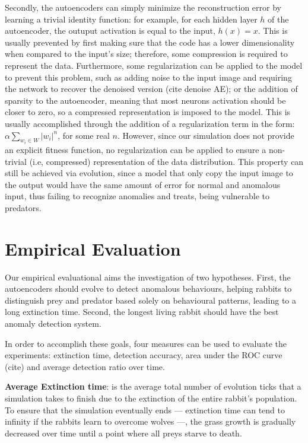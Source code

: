 \documentclass[letterpaper]{article}
\numberwithin{equation}{section}
\numberwithin{theorem}{section}
\numberwithin{lemma}{section}
\numberwithin{df}{section}
\begin{document}
Secondly, the autoencoders can simply minimize the reconstruction error by learning a trivial identity function: for example, for each hidden layer $h$ of the autoencoder, the outuput activation is equal to the input, $h(x) = x$. This is usually prevented by first making sure that the code has a lower dimensionality when compared to the input's size; therefore, some compression is required to represent the data. Furthermore, some regularization can be applied to the model to prevent this problem, such as adding noise to the input image and requiring the network to recover the denoised version (cite denoise AE); or the addition of sparsity to the autoencoder, meaning that most neurons activation should be closer to zero, so a compressed representation is imposed to the model. This is usually accomplished through the addition of a regularization term in the form: $\alpha \sum_{w_i \in W} |w_i| ^ n$, for some real $n$. However, since our simulation does not provide an explicit fitness function, no regularization can be applied to ensure a non-trivial (i.e, compressed) representation of the data distribution. This property can still be achieved via evolution, since a model that only copy the input image to the output would have the same amount of error for normal and anomalous input, thus failing to recognize anomalies and treats, being vulnerable to predators.


\section{Empirical Evaluation}

Our empirical evaluational aims the investigation of two hypotheses. First, the autoencoders should evolve to detect anomalous behaviours, helping rabbits to distinguish prey and predator based solely on behavioural patterns, leading to a long extinction time. Second, the longest living rabbit should have the best anomaly detection system. 
 
In order to accomplish these goals, four measures can be used to evaluate the experiments: extinction time, detection accuracy, area under the ROC curve (cite) and average detection ratio over time.

\textbf{Average Extinction time}: is the average total number of evolution ticks that a simulation takes to finish due to the extinction of the entire rabbit's population. To ensure that the simulation eventually ends --- extinction time can tend to infinity if the rabbits learn to overcome wolves ---, the grass growth is gradually decreased over time until a point where all preys starve to death.
\end{document}
